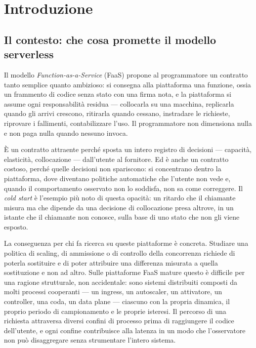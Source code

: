 \chapter{Introduzione}
\label{cap:01-introduzione}

\section{Il contesto: che cosa promette il modello serverless}

Il modello \emph{Function-as-a-Service} (FaaS) propone al programmatore un
contratto tanto semplice quanto ambizioso: si consegna alla piattaforma una
funzione, ossia un frammento di codice senza stato con una firma nota, e la
piattaforma si assume ogni responsabilit\`a residua --- collocarla su una
macchina, replicarla quando gli arrivi crescono, ritirarla quando cessano,
instradare le richieste, riprovare i fallimenti, contabilizzare l'uso. Il
programmatore non dimensiona nulla e non paga nulla quando nessuno invoca.

\`E un contratto attraente perch\'e sposta un intero registro di decisioni
--- capacit\`a, elasticit\`a, collocazione --- dall'utente al fornitore. Ed \`e
anche un contratto costoso, perch\'e quelle decisioni non spariscono: si
concentrano dentro la piattaforma, dove diventano politiche automatiche che
l'utente non vede e, quando il comportamento osservato non lo soddisfa, non sa
come correggere. Il \emph{cold start} \`e l'esempio pi\`u noto di questa
opacit\`a: un ritardo che il chiamante misura ma che dipende da una decisione
di collocazione presa altrove, in un istante che il chiamante non conosce, sulla
base di uno stato che non gli viene esposto.

La conseguenza per chi fa ricerca su queste piattaforme \`e concreta. Studiare
una politica di scaling, di ammissione o di controllo della concorrenza richiede
di poterla sostituire e di poter attribuire una differenza misurata a quella
sostituzione e non ad altro. Sulle piattaforme FaaS mature questo \`e difficile
per una ragione strutturale, non accidentale: sono sistemi distribuiti composti
da molti processi cooperanti --- un ingress, un autoscaler, un attivatore, un
controller, una coda, un data plane --- ciascuno con la propria dinamica, il
proprio periodo di campionamento e le proprie isteresi. Il percorso di una
richiesta attraversa diversi confini di processo prima di raggiungere il codice
dell'utente, e ogni confine contribuisce alla latenza in un modo che
l'osservatore non pu\`o disaggregare senza strumentare l'intero sistema.


